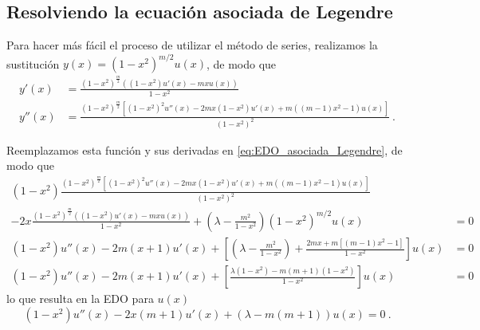 \subsection{Resolviendo la ecuación asociada de Legendre}

Para hacer más fácil el proceso de utilizar el método de series, realizamos la sustitución $y(x) = (1-x^2)^{m/2} u(x)$, de modo que
\begin{align*}
    y'(x) & = \frac{\left(1 - x^{2}\right)^{\frac{m}{2}} \left((1 - x^2) u'\left(x\right) - mx u\left(x\right)\right)}{1 - x^2} \\
    y''(x) & = \frac{\left(1 - x^{2}\right)^{\frac{m}{2}} \left[(1-x^2)^2 u'' \left(x\right) - 2mx (1 - x^2) u'(x) + m\left((m - 1) x^{2} - 1\right) u\left(x\right)\right]}{(1- x^2)^2} \ .
\end{align*}

Reemplazamos esta función y sus derivadas en \eqref{eq:EDO_asociada_Legendre}, de modo que
\begin{align*}
    (1-x^2)\frac{\left(1 - x^{2}\right)^{\frac{m}{2}} \left[(1-x^2)^2 u'' \left(x\right) - 2mx (1 - x^2) u'(x) + m\left((m - 1) x^{2} - 1\right) u\left(x\right)\right]}{(1- x^2)^2} & \\
    - 2x \frac{\left(1 - x^{2}\right)^{\frac{m}{2}} \left((1 - x^2) u'\left(x\right) - mx u\left(x\right)\right)}{1 - x^2} + \left(\lambda - \frac{m^2}{1-x^2}\right) (1-x^2)^{m/2} u(x) & = 0 \\
    (1-x^2) u''(x)  - 2m (x + 1) u'(x) + \left[ \left( \lambda - \frac{m^2}{1-x^2} \right) + \frac{2mx + m[(m-1)x^2 - 1]}{1-x^2} \right]u(x) & = 0 \\
    (1-x^2) u''(x)  - 2m (x + 1) u'(x) + \left[ \frac{\lambda(1-x^2) - m(m+1)(1-x^2)}{1-x^2} \right]u(x) & = 0 \,
\end{align*}
%
%
%
%
lo que resulta en la EDO para $u(x)$
\begin{equation}
    (1-x^2)u''(x) - 2x(m+1)u'(x) + (\lambda - m(m+1))u(x) = 0 \ .
\end{equation}

